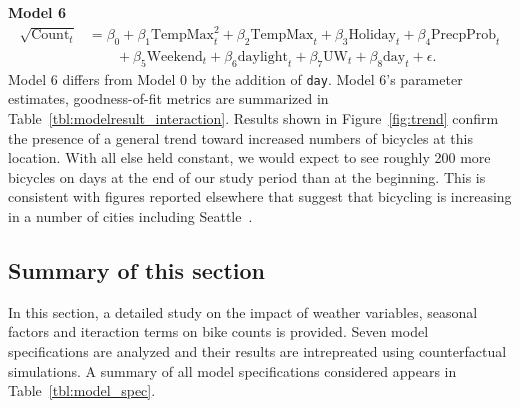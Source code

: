 \documentclass [11pt, proquest] {uwthesis}[2015/03/03]
\begin{document}
\textbf{Model 6}
\begin{align}
\sqrt{\text{Count}_t} &= \beta_0 + \beta_1 \text{TempMax}^2_t + \beta_2 \text{TempMax}_t + \beta_3 \text{Holiday}_t + \beta_4 \text{PrecpProb}_t \nonumber\\
&\qquad +\beta_5 \text{Weekend}_t  + \beta_6 \text{daylight}_t + \beta_7 \text{UW}_t + \beta_8\text{day}_t + \epsilon. \label{eqref:model6}
\end{align}
Model 6 differs from Model 0 by the addition of \texttt{day}. Model 6's parameter estimates, goodness-of-fit metrics are summarized in Table~\ref{tbl:modelresult_interaction}. Results shown in Figure~\ref{fig:trend} confirm the presence of a general trend toward increased numbers of bicycles at this location. With all else held constant, we would expect to see roughly 200 more bicycles on days at the end of our study period than at the beginning. This is consistent with figures
reported elsewhere that suggest that bicycling is increasing in a number of cities including Seattle~\cite{League-of-American-Bicyclists:aa}.

\subsection{Summary of this section}
In this section, a detailed study on the impact of weather variables, seasonal factors and iteraction terms on bike counts is provided. Seven model specifications are analyzed and their results are intrepreated using counterfactual simulations. A summary of all model specifications considered appears in Table~\ref{tbl:model_spec}. 
\end{document}
